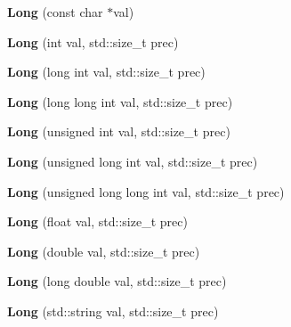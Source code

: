 \begin{DoxyCompactItemize}
{\bfseries Long} (const char $\ast$val)
\item 
\mbox{\label{classradix_1_1Long_a0d938a279b3973c1df096b1a242c4294}} 
{\bfseries Long} (int val, std\+::size\+\_\+t prec)
\item 
\mbox{\label{classradix_1_1Long_af02fcb04d4e31810dfd96197c1aabbb7}} 
{\bfseries Long} (long int val, std\+::size\+\_\+t prec)
\item 
\mbox{\label{classradix_1_1Long_a1172cd96885db3bc64b7c176b9d19188}} 
{\bfseries Long} (long long int val, std\+::size\+\_\+t prec)
\item 
\mbox{\label{classradix_1_1Long_af271dfca36d5e06525b01947f70ed0e2}} 
{\bfseries Long} (unsigned int val, std\+::size\+\_\+t prec)
\item 
\mbox{\label{classradix_1_1Long_ae6bf7d79dd34fcb24d90fbac12fde53d}} 
{\bfseries Long} (unsigned long int val, std\+::size\+\_\+t prec)
\item 
\mbox{\label{classradix_1_1Long_a66e89240bd4f7c4690bff7f4943f97e4}} 
{\bfseries Long} (unsigned long long int val, std\+::size\+\_\+t prec)
\item 
\mbox{\label{classradix_1_1Long_a1c3f9b2ad843c4bf66bf602f12ce300d}} 
{\bfseries Long} (float val, std\+::size\+\_\+t prec)
\item 
\mbox{\label{classradix_1_1Long_ae94f450a01a686857b587f46ff02cd69}} 
{\bfseries Long} (double val, std\+::size\+\_\+t prec)
\item 
\mbox{\label{classradix_1_1Long_abaa677963a90987b2bef8c645b7d6d47}} 
{\bfseries Long} (long double val, std\+::size\+\_\+t prec)
\item 
\mbox{\label{classradix_1_1Long_a03c37ee6515eb03e2251fb6f318c22bf}} 
{\bfseries Long} (std\+::string val, std\+::size\+\_\+t prec)
\item 
\mbox{\label{classradix_1_1Long_a88c8a6361a9cd3c6dbbf88128b98ea42}} 

\end{DoxyCompactItemize}
